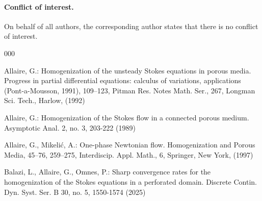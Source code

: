 \documentclass[13pt,CJK]{article}
\theoremstyle{plain}                       %
\theoremstyle{remark}
\numberwithin{equation}{section}
\begin{document}
\paragraph{Conflict of interest.} 
On behalf of all authors, the corresponding author states that there is no conflict of interest.


%
%

\begin{thebibliography}{000}



Allaire, G.:
Homogenization of the unsteady Stokes equations in porous media.
Progress in partial differential equations: calculus of variations,
applications (Pont-a-Mousson, 1991), 109–123, Pitman Res. Notes Math. Ser., 267,
Longman Sci. Tech., Harlow,
(1992)

Allaire, G.:  Homogenization of the Stokes flow in a connected porous medium. Asymptotic Anal. 2, no. 3, 203-222
(1989)



Allaire, G., Mikeli\'c, A.:
One-phase Newtonian flow.
Homogenization and Porous Media, 45–76, 259–275,
Interdiscip. Appl. Math., 6, Springer, New York,
(1997)





Balazi, L., Allaire, G., Omnes, P.:
Sharp convergence rates for the homogenization of the Stokes
equations in a perforated domain.
Discrete Contin. Dyn. Syst. Ser. B 30, no. 5, 1550-1574 (2025)


\end{thebibliography}
\end{document}
